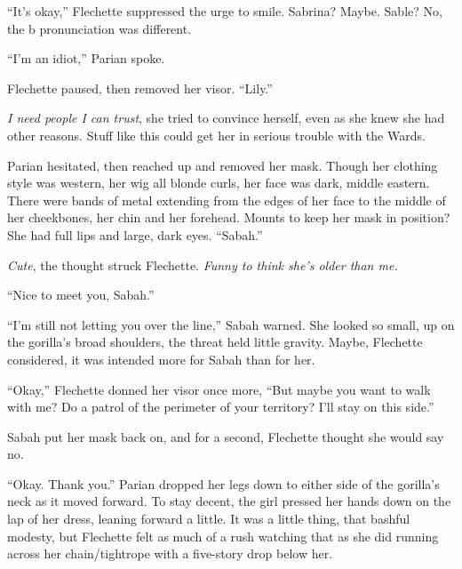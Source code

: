 ``It's okay,'' Flechette suppressed the urge to smile.  Sabrina?  Maybe.  Sable?  No, the b pronunciation was different.



``I'm an idiot,''  Parian spoke.



Flechette paused, then removed her visor.  ``Lily.''



\emph{I need people I can trust}, she tried to convince herself, even as she knew she had other reasons.  Stuff like this could get her in serious trouble with the Wards.



Parian hesitated, then reached up and removed her mask.  Though her clothing style was western, her wig all blonde curls, her face was dark, middle eastern.  There were bands of metal extending from the edges of her face to the middle of her cheekbones, her chin and her forehead.  Mounts to keep her mask in position?  She had full lips and large, dark eyes. ``Sabah.''



\emph{Cute}, the thought struck Flechette.  \emph{Funny to think she's older than me.}



``Nice to meet you, Sabah.''



``I'm still not letting you over the line,'' Sabah warned.  She looked so small, up on the gorilla's broad shoulders, the threat held little gravity.  Maybe, Flechette considered, it was intended more for Sabah than for her.



``Okay,'' Flechette donned her visor once more, ``But maybe you want to walk with me?  Do a patrol of the perimeter of your territory?  I'll stay on this side.''



Sabah put her mask back on, and for a second, Flechette thought she would say no.



``Okay.  Thank you.''  Parian dropped her legs down to either side of the gorilla's neck as it moved forward. To stay decent, the girl pressed her hands down on the lap of her dress, leaning forward a little.  It was a little thing, that bashful modesty, but Flechette felt as much of a rush watching that as she did running across her chain/tightrope with a five-story drop below her.



